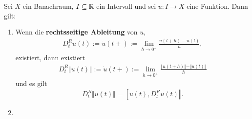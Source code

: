 \begin{lemma}
Sei $X$ ein Banachraum, $I\subseteq\mathbb{R}$ ein Intervall und sei $u:I\to X$ eine Funktion. Dann gilt:
\begin{enumerate}[label=(\alph*)]
\item Wenn die \textbf{rechtsseitige Ableitung} von $u$, 
\begin{align*}
D_t^R u(t):=\dot{u}(t+):=\lim\limits_{h\to 0^+}\frac{u(t+h)-u(t)}{h},
\end{align*}
existiert, dann existiert
\begin{align*}
D_t^R \Vert u(t)\Vert:=\dot{u}(t+):=\lim\limits_{h\to 0^+}\frac{\Vert u(t+h)\Vert-\Vert u(t)\Vert}{h}
\end{align*}
und es gilt
\begin{align*}
D_t^R\Vert u(t)\Vert=\left[u(t),D_t^R u(t)\right\Vert.
\end{align*}
\item
\end{enumerate}
\end{lemma}

